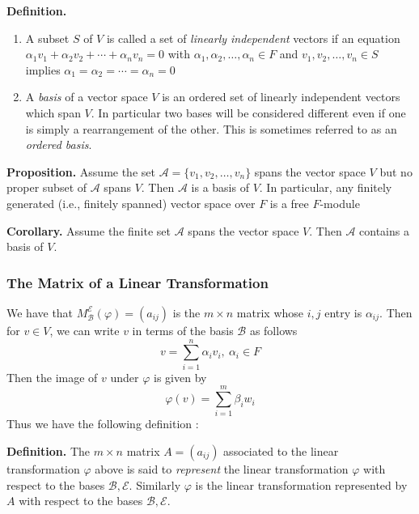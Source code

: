 \documentclass[11pt, reqno]{amsart}
\theoremstyle{plain}
\theoremstyle{definition}
\theoremstyle{example}
\begin{document}
\par
\textbf{Definition.} \begin{enumerate}
\item A subset $S$ of $V$ is called a set of \textit{linearly independent} vectors if an equation $\alpha_1 v_1 + \alpha_2 v_2 + \cdots + \alpha_n v_n = 0$ with $\alpha_1, \alpha_2, \ldots, \alpha_n \in F$ and $v_1, v_2, \ldots, v_n \in S$ implies $\alpha_1 = \alpha_2 = \cdots = \alpha_n = 0$
\item A \textit{basis} of a vector space $V$ is an ordered set of linearly independent vectors which span $V$. In particular two bases will be considered different even if one is simply a rearrangement of the other. This is sometimes referred to as an \textit{ordered basis}.
\end{enumerate}

\textbf{Proposition.} Assume the set $\mathcal{A} = \{v_1, v_2, \ldots, v_n\}$ spans the vector space $V$ but no proper subset of $\mathcal{A}$ spans $V$. Then $\mathcal{A}$ is a basis of $V$. In particular, any finitely generated (i.e., finitely spanned) vector space over $F$ is a free $F$-module

\par
\textbf{Corollary.} Assume the finite set $\mathcal{A}$ spans the vector space $V$. Then $\mathcal{A}$ contains a basis of $V$.

\newpage
\subsubsection{The Matrix of a Linear Transformation}

We have that $M_{\mathcal{B}}^{\mathcal{E}}(\varphi) = (a_{ij})$ is the $m \times n$ matrix whose $i, j$ entry is $\alpha_{ij}$. Then for $v \in V$, we can write $v$ in terms of the basis $\mathcal{B}$ as follows $$v = \sum_{i=1}^n \alpha_i v_i, \ \alpha_i \in F$$Then the image of $v$ under $\varphi$ is given by $$\varphi(v) = \sum_{i=1}^m \beta_i w_i$$Thus we have the following definition \cite[\S 11.2, p. 415]{dummit}:

\par
\textbf{Definition.} The $m \times n$ matrix $A = (a_{ij})$ associated to the linear transformation $\varphi$ above is said to \textit{represent} the linear transformation $\varphi$ with respect to the bases $\mathcal{B}, \mathcal{E}$. Similarly $\varphi$ is the linear transformation represented by $A$ with respect to the bases $\mathcal{B}, \mathcal{E}$.
\end{document}
